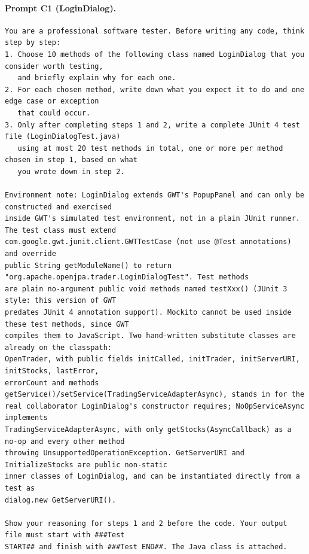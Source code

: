 \paragraph*{Prompt C1 (LoginDialog).}
\label{prompt:ld-c1}
\begin{lstlisting}
You are a professional software tester. Before writing any code, think step by step:
1. Choose 10 methods of the following class named LoginDialog that you consider worth testing,
   and briefly explain why for each one.
2. For each chosen method, write down what you expect it to do and one edge case or exception
   that could occur.
3. Only after completing steps 1 and 2, write a complete JUnit 4 test file (LoginDialogTest.java)
   using at most 20 test methods in total, one or more per method chosen in step 1, based on what
   you wrote down in step 2.

Environment note: LoginDialog extends GWT's PopupPanel and can only be constructed and exercised
inside GWT's simulated test environment, not in a plain JUnit runner. The test class must extend
com.google.gwt.junit.client.GWTTestCase (not use @Test annotations) and override
public String getModuleName() to return "org.apache.openjpa.trader.LoginDialogTest". Test methods
are plain no-argument public void methods named testXxx() (JUnit 3 style: this version of GWT
predates JUnit 4 annotation support). Mockito cannot be used inside these test methods, since GWT
compiles them to JavaScript. Two hand-written substitute classes are already on the classpath:
OpenTrader, with public fields initCalled, initTrader, initServerURI, initStocks, lastError,
errorCount and methods getService()/setService(TradingServiceAdapterAsync), stands in for the
real collaborator LoginDialog's constructor requires; NoOpServiceAsync implements
TradingServiceAdapterAsync, with only getStocks(AsyncCallback) as a no-op and every other method
throwing UnsupportedOperationException. GetServerURI and InitializeStocks are public non-static
inner classes of LoginDialog, and can be instantiated directly from a test as
dialog.new GetServerURI().

Show your reasoning for steps 1 and 2 before the code. Your output file must start with ###Test
START## and finish with ###Test END##. The Java class is attached.
\end{lstlisting}

